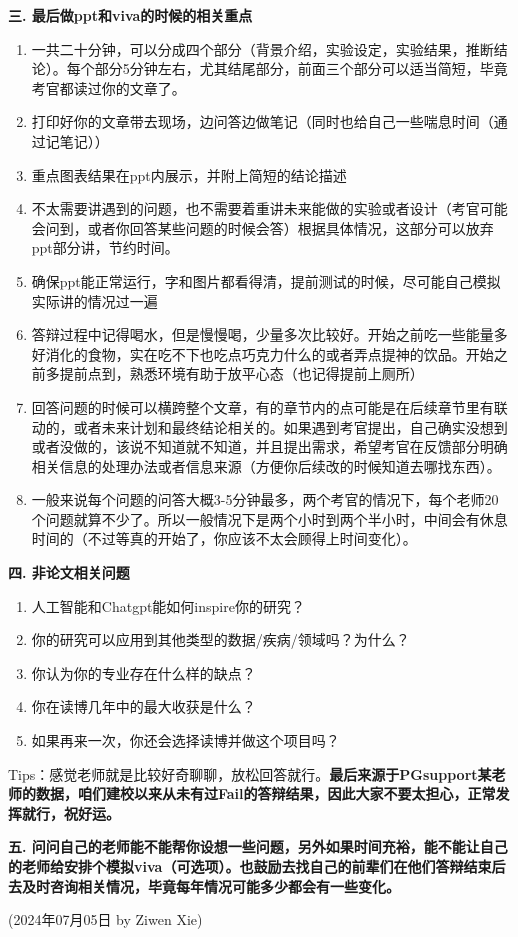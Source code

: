 \textbf{三. 最后做ppt和viva的时候的相关重点}
\begin{enumerate}
    \item 一共二十分钟，可以分成四个部分（背景介绍，实验设定，实验结果，推断结论）。每个部分5分钟左右，尤其结尾部分，前面三个部分可以适当简短，毕竟考官都读过你的文章了。
    \item 打印好你的文章带去现场，边问答边做笔记（同时也给自己一些喘息时间（通过记笔记））
    \item 重点图表结果在ppt内展示，并附上简短的结论描述
    \item 不太需要讲遇到的问题，也不需要着重讲未来能做的实验或者设计（考官可能会问到，或者你回答某些问题的时候会答）根据具体情况，这部分可以放弃ppt部分讲，节约时间。
    \item 确保ppt能正常运行，字和图片都看得清，提前测试的时候，尽可能自己模拟实际讲的情况过一遍
    \item 答辩过程中记得喝水，但是慢慢喝，少量多次比较好。开始之前吃一些能量多好消化的食物，实在吃不下也吃点巧克力什么的或者弄点提神的饮品。开始之前多提前点到，熟悉环境有助于放平心态（也记得提前上厕所）
    \item 回答问题的时候可以横跨整个文章，有的章节内的点可能是在后续章节里有联动的，或者未来计划和最终结论相关的。如果遇到考官提出，自己确实没想到或者没做的，该说不知道就不知道，并且提出需求，希望考官在反馈部分明确相关信息的处理办法或者信息来源（方便你后续改的时候知道去哪找东西）。
    \item 一般来说每个问题的问答大概3-5分钟最多，两个考官的情况下，每个老师20个问题就算不少了。所以一般情况下是两个小时到两个半小时，中间会有休息时间的（不过等真的开始了，你应该不太会顾得上时间变化）。
\end{enumerate}

\textbf{四. 非论文相关问题}
\begin{enumerate}
    \item 人工智能和Chatgpt能如何inspire你的研究？
    \item 你的研究可以应用到其他类型的数据/疾病/领域吗？为什么？
    \item 你认为你的专业存在什么样的缺点？
    \item 你在读博几年中的最大收获是什么？
    \item 如果再来一次，你还会选择读博并做这个项目吗？
\end{enumerate}
Tips：感觉老师就是比较好奇聊聊，放松回答就行。\textbf{最后来源于PGsupport某老师的数据，咱们建校以来从未有过Fail的答辩结果，因此大家不要太担心，正常发挥就行，祝好运。} 

\textbf{五. 问问自己的老师能不能帮你设想一些问题，另外如果时间充裕，能不能让自己的老师给安排个模拟viva（可选项）。也鼓励去找自己的前辈们在他们答辩结束后去及时咨询相关情况，毕竟每年情况可能多少都会有一些变化。}

\begin{flushright}
    (2024年07月05日 by Ziwen Xie)
\end{flushright}
